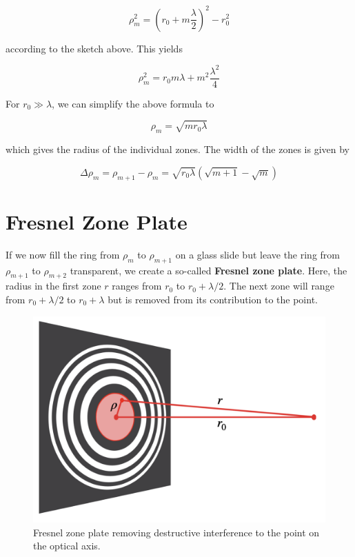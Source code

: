 \documentclass[
  a4paper,
]{book}
\begin{document}
\[
\rho_{m}^2 = \left( r_0 + m \frac{\lambda}{2} \right)^2 - r_0^2
\]

according to the sketch above. This yields

\[
\rho_m^2 = r_0 m \lambda + m^2 \frac{\lambda^2}{4}
\]

For \(r_{0} \gg \lambda\), we can simplify the above formula to

\[
\rho_m = \sqrt{m r_0 \lambda}
\]

which gives the radius of the individual zones. The width of the zones
is given by

\[
\Delta \rho_m = \rho_{m+1} - \rho_m = \sqrt{r_0 \lambda} (\sqrt{m+1} - \sqrt{m})
\]

\section{Fresnel Zone Plate}\label{fresnel-zone-plate}

If we now fill the ring from \(\rho_m\) to \(\rho_{m+1}\) on a glass
slide but leave the ring from \(\rho_{m+1}\) to \(\rho_{m+2}\)
transparent, we create a so-called \textbf{Fresnel zone plate}. Here,
the radius in the first zone \(r\) ranges from \(r_0\) to
\(r_0 + \lambda/2\). The next zone will range from \(r_0 + \lambda/2\)
to \(r_0 + \lambda\) but is removed from its contribution to the point.

\begin{figure}[H]

{\centering \includegraphics[width=0.75\linewidth,height=\textheight,keepaspectratio]{wave-optics/img/zone_plate.png}

}

\caption{Fresnel zone plate removing destructive interference to the
point on the optical axis.}

\end{figure}%
\end{document}
